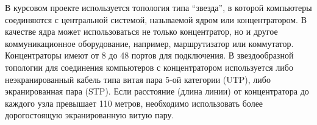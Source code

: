 \begin{description}
  В курсовом проекте используется топология типа “звезда”, в которой компьютеры соединяются с центральной системой, называемой ядром или концентратором. В качестве ядра может использоваться не только концентратор, но и другое коммуникационное оборудование, например, маршрутизатор или коммутатор. Концентраторы имеют от 8 до 48 портов для подключения. В звездообразной топологии для соединения компьютеров с концентратором используется либо неэкранированный кабель типа витая пара 5-ой категории (UTP), либо экранированная пара (STP). Если расстояние (длина линии) от концентратора до каждого узла превышает 110 метров, необходимо использовать более дорогостоящую экранированную витую пару.
\end{description}